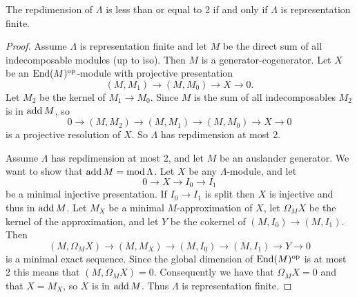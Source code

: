 \begin{theorem}
	The repdimension of $\Lambda$ is less than or equal to 2 if and only if $\Lambda$ is representation finite.
	\begin{proof}
		Assume $\Lambda$ is representation finite and let $M$ be the direct sum of all indecomposable modules (up to iso). Then $M$ is a generator-cogenerator. Let $X$ be an $\operatorname{End}(M)^{\operatorname{op}}$-module with projective presentation $$(M,M_1) \to (M, M_0) \to X \to 0.$$ Let $M_2$ be the kernel of $M_1 \to M_0$. Since $M$ is the sum of all indecomposables $M_2$ is in $\operatorname{add} M$, so $$0 \to (M, M_2) \to (M,M_1) \to (M, M_0) \to X \to 0$$ is a projective resolution of $X$. So $\Lambda$ has repdimension at most 2.
		
		Assume $\Lambda$ has repdimension at most 2, and let $M$ be an auslander generator. We want to show that $\operatorname{add} M = \operatorname{mod}\Lambda$. Let $X$ be any $\Lambda$-module, and let $$0 \to X \to I_0 \to I_1$$ be a minimal injective presentation. If $I_0 \to I_1$ is split then $X$ is injective and thus in $\operatorname{add} M$. Let $M_X$ be a minimal $M$-approximation of $X$, let $\Omega_M X$ be the kernel of the approximation, and let $Y$ be the cokernel of $(M, I_0) \to (M, I_1)$. Then $$(M,\Omega_M X) \to (M,M_X) \to (M, I_0) \to (M, I_1) \to Y \to 0$$ is a minimal exact sequence. Since the global dimension of $\operatorname{End}(M)^{\operatorname{op}}$ is at most 2 this means that $(M, \Omega_M X)=0$. Consequently we have that $\Omega_M X = 0$ and that $X=M_X$, so $X$ is in $\operatorname{add} M$. Thus $\Lambda$ is representation finite.
	\end{proof}
\end{theorem}

